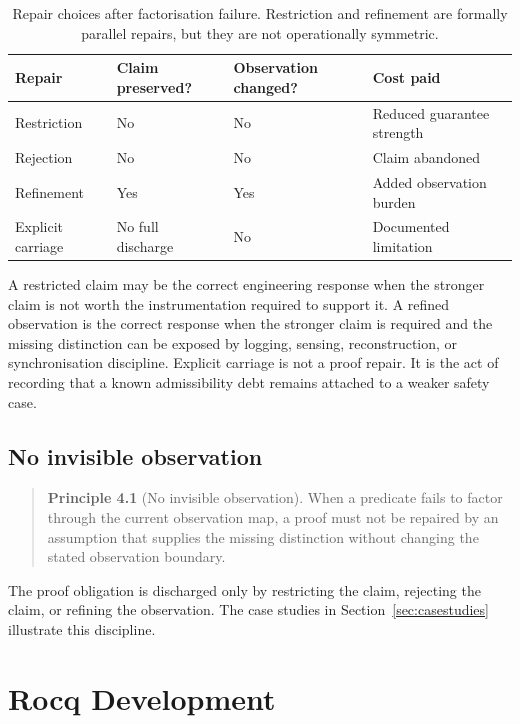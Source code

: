 \documentclass[a4paper,11pt]{article}
\begin{document}
\begin{table}[t]
\centering
\small
\begin{tabular}{p{2.2cm}p{2.5cm}p{2.8cm}p{3.5cm}}
\hline
Repair & Claim preserved? & Observation changed? & Cost paid \\
\hline
Restriction & No & No & Reduced guarantee strength \\[4pt]
Rejection   & No & No & Claim abandoned \\[4pt]
Refinement  & Yes & Yes & Added observation burden \\[4pt]
Explicit carriage & No full discharge & No & Documented limitation \\
\hline
\end{tabular}
\caption{Repair choices after factorisation failure.  Restriction and refinement
are formally parallel repairs, but they are not operationally symmetric.}
\label{tab:repair-choice}
\end{table}

A restricted claim may be the correct engineering response when the stronger
claim is not worth the instrumentation required to support it.  A refined
observation is the correct response when the stronger claim is required and
the missing distinction can be exposed by logging, sensing, reconstruction,
or synchronisation discipline.  Explicit carriage is not a proof repair.  It
is the act of recording that a known admissibility debt remains attached to a
weaker safety case.

\subsection{No invisible observation}

\begin{quote}
\textbf{Principle 4.1} (No invisible observation). When a predicate fails to
factor through the current observation map, a proof must not be repaired by an
assumption that supplies the missing distinction without changing the stated
observation boundary.
\end{quote}

The proof obligation is discharged only by restricting the claim, rejecting the
claim, or refining the observation. The case studies in
Section~\ref{sec:casestudies} illustrate this discipline.

\section{Rocq Development}
\label{sec:rocq}
\end{document}
